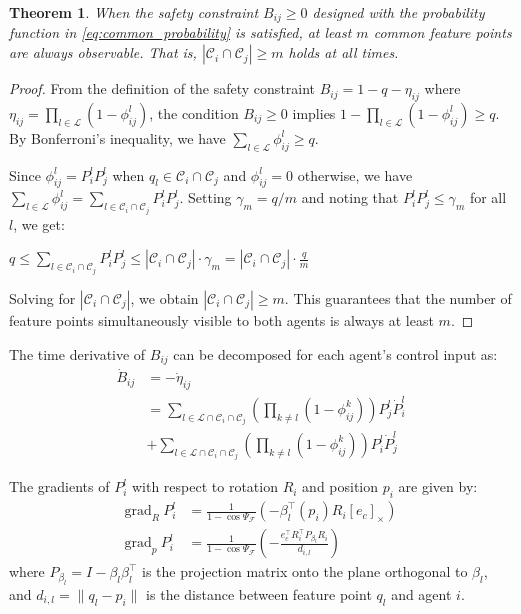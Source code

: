 \documentclass[fleqn,10pt,twocolumn]{SICE_FES25}
\theoremstyle{definition}
\theoremstyle{plain}
\newtheorem{mytheorem}{Theorem}
\begin{document}
\begin{mytheorem}
When the safety constraint $B_{ij} \geq 0$ designed with the probability function in \eqref{eq:common_probability} is satisfied, at least $m$ common feature points are always observable. That is, $|{\mathcal{C}}_i \cap {\mathcal{C}}_j| \geq m$ holds at all times.
\end{mytheorem}
\begin{proof}
From the definition of the safety constraint $B_{ij} = 1 - q - \eta_{ij}$ where $\eta_{ij} = \prod_{l \in \mathcal{L}} (1 - \phi_{ij}^l)$, the condition $B_{ij} \geq 0$ implies $1 - \prod_{l \in \mathcal{L}} (1 - \phi_{ij}^l) \geq q$. By Bonferroni's inequality, we have $\sum_{l \in \mathcal{L}} \phi_{ij}^l \geq q$.

Since $\phi_{ij}^l = P_i^l P_j^l$ when $q_l \in {\mathcal{C}}_i \cap {\mathcal{C}}_j$ and $\phi_{ij}^l = 0$ otherwise, we have $\sum_{l \in \mathcal{L}} \phi_{ij}^l = \sum_{l \in {\mathcal{C}}_i \cap {\mathcal{C}}_j} P_i^l P_j^l$. Setting $\gamma_m = q/m$ and noting that $P_i^l P_j^l \leq \gamma_m$ for all $l$, we get:

$q \leq \sum_{l \in {\mathcal{C}}_i \cap {\mathcal{C}}_j} P_i^l P_j^l \leq |{\mathcal{C}}_i \cap {\mathcal{C}}_j| \cdot \gamma_m = |{\mathcal{C}}_i \cap {\mathcal{C}}_j| \cdot \frac{q}{m}$

Solving for $|{\mathcal{C}}_i \cap {\mathcal{C}}_j|$, we obtain $|{\mathcal{C}}_i \cap {\mathcal{C}}_j| \geq m$. This guarantees that the number of feature points simultaneously visible to both agents is always at least $m$.
\end{proof}

The time derivative of $B_{ij}$ can be decomposed for each agent's control input as:
\begin{equation}
\begin{aligned}
\dot{B}_{ij} &= -\dot{\eta}_{ij} \\
&= \sum_{l \in \mathcal{L} \cap {\mathcal{C}}_i \cap {\mathcal{C}}_j}\left(\prod_{k \neq l}(1 - \phi_{ij}^k)\right)P_j^l\dot{P}_i^l \\
&+ \sum_{l \in \mathcal{L} \cap {\mathcal{C}}_i \cap {\mathcal{C}}_j}\left(\prod_{k \neq l}(1 - \phi_{ij}^k)\right)P_i^l\dot{P}_j^l
\label{eq:common_cbf_derivative_decomposed}
\end{aligned}
\end{equation}

The gradients of $P_i^l$ with respect to rotation $R_i$ and position $p_i$ are given by:
\begin{equation}
\begin{aligned}
{\mathrm{grad}}_R\:P_i^l &= \frac{1}{1 - \cos\Psi_{\mathcal{F}}}(-\beta_l^\top(p_i) R_i [e_c]_\times) \\
{\mathrm{grad}}_p\:P_i^l &= \frac{1}{1 - \cos\Psi_{\mathcal{F}}}\left(-\frac{e_c^\top R_i^\top P_{\beta_l}R_i}{d_{i,l}}\right)
\label{eq:visibility_probability_gradient}
\end{aligned}
\end{equation}
where $P_{\beta_l} = I - \beta_l\beta_l^\top$ is the projection matrix onto the plane orthogonal to $\beta_l$, and $d_{i,l} = \|q_l-p_i\|$ is the distance between feature point $q_l$ and agent $i$.
\end{document}
